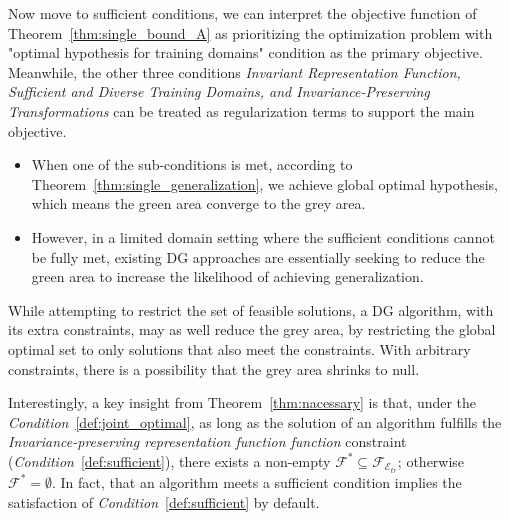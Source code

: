 

Now move to sufficient conditions, we can interpret the objective function of Theorem~\ref{thm:single_bound_A} as prioritizing the optimization problem with "optimal hypothesis for training domains" condition as the primary objective. Meanwhile, the other three conditions \textit{Invariant Representation Function, Sufficient and Diverse Training Domains, and Invariance-Preserving Transformations} can be treated as regularization terms to support the main objective.

\begin{itemize}
    \item When one of the sub-conditions is met, according to Theorem~\ref{thm:single_generalization}, we achieve global optimal hypothesis, which means the green area converge to the grey area. 

    \item However, in a limited domain setting where the sufficient conditions cannot be fully met, existing DG approaches are essentially seeking to reduce the green area to increase the likelihood of achieving generalization.
\end{itemize}
 
While attempting to restrict the set of feasible solutions, a DG algorithm, with its extra constraints, may as well reduce the grey area, by restricting the global optimal set to only solutions that also meet the constraints. With arbitrary constraints, there is a possibility that the grey area shrinks to null. 

Interestingly, a key insight from Theorem~\ref{thm:nacessary} is that, under the \textit{Condition}~\ref{def:joint_optimal}, as long as the solution of an algorithm fulfills the \textit{Invariance-preserving representation function function} constraint (\textit{Condition}~\ref{def:sufficient}), there exists a non-empty $\mathcal{F}^{*} \subseteq \mathcal{F}_{\mathcal{E}_{tr}}$; otherwise $\mathcal{F}^{*} = \emptyset$. In fact, that an algorithm meets a sufficient condition implies the satisfaction of \textit{Condition}~\ref{def:sufficient} by default.


